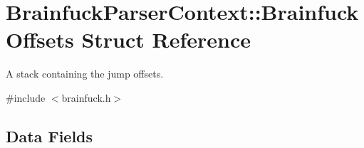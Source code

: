 \hypertarget{structBrainfuckParserContext_1_1BrainfuckOffsets}{}\section{Brainfuck\+Parser\+Context\+:\+:Brainfuck\+Offsets Struct Reference}
\label{structBrainfuckParserContext_1_1BrainfuckOffsets}


A stack containing the jump offsets.  




{\ttfamily \#include $<$brainfuck.\+h$>$}

\subsection*{Data Fields}
